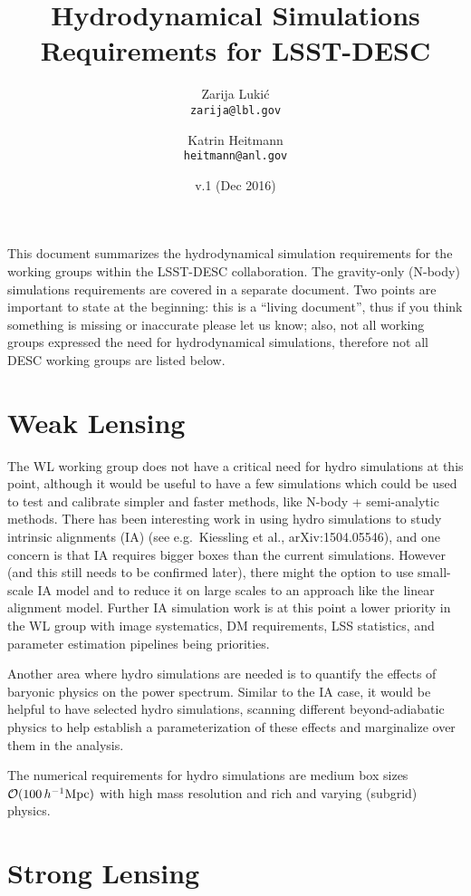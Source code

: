 \documentclass[11pt, margin=1in]{article}
\title{Hydrodynamical Simulations Requirements for LSST-DESC}
\author{
  Zarija Luki\'c\\      \texttt{zarija@lbl.gov}
  \and
  Katrin Heitmann\\     \texttt{heitmann@anl.gov}
}
\date{v.1 (Dec 2016)}
\begin{document}
\maketitle

This document summarizes the hydrodynamical simulation requirements for the working groups within the
LSST-DESC collaboration. The gravity-only (N-body) simulations requirements are covered in a separate document.
Two points are important to state at the beginning: this is a ``living document'',
thus if you think something is missing or inaccurate please let us know; also, not all working
groups expressed the need for hydrodynamical simulations, therefore not all DESC working groups are
listed below.


\section{Weak Lensing}

The WL working group does not have a critical need for hydro simulations at this point,
although it would be useful to have a few simulations which could be used to test and
calibrate simpler and faster methods, like N-body + semi-analytic methods.
There has been interesting work in using hydro simulations to study intrinsic alignments (IA)
(see e.g.~Kiessling et al., arXiv:1504.05546), and one concern is that IA requires bigger boxes than the current simulations.
However (and this still needs to be confirmed later), there might the option to use small-scale IA model and to reduce it
on large scales to an approach like the linear alignment model.
Further IA simulation work is at this point a lower priority in the WL group with image systematics,
DM requirements, LSS statistics, and parameter estimation pipelines being priorities.

Another area where hydro simulations are needed is to quantify the effects of baryonic physics
on the power spectrum.  Similar to the IA case, it would be helpful to have selected hydro simulations,
scanning different beyond-adiabatic physics to help establish a parameterization of these effects
and marginalize over them in the analysis.

The numerical requirements for hydro simulations are medium box sizes
$\mathcal{O} (100 \,  h^{-1} {\rm Mpc})$ with high mass resolution and rich and varying (subgrid) physics.


\section{Strong Lensing}
\end{document}
